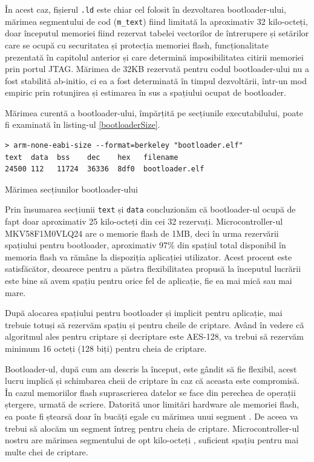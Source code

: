\documentclass[12pt,a4paper,titlepage]{report}
\begin{document}
În acest caz, fișierul \texttt{.ld} este chiar cel folosit în dezvoltarea bootloader-ului, mărimea segmentului de cod (\texttt{m\_text}) fiind limitată la aproximativ 32 kilo-octeți, doar începutul memoriei fiind rezervat tabelei vectorilor de întrerupere și setărilor care se ocupă cu securitatea și protecția memoriei flash, funcționalitate prezentată în capitolul anterior și care determină imposibilitatea citirii memoriei prin portul JTAG. Mărimea de 32KB rezervată pentru codul bootloader-ului nu a fost stabilită ab-initio, ci ea a fost determinată în timpul dezvoltării, într-un mod empiric prin rotunjirea și estimarea în sus a spațiului ocupat de bootloader.

Mărimea curentă a bootloader-ului, împărțită pe secțiunile executabilului, poate fi examinată în listing-ul \ref{bootloaderSize}.

\begin{listing}[h]
\begin{verbatim}
> arm-none-eabi-size --format=berkeley "bootloader.elf"
text  data  bss    dec    hex   filename
24500 112   11724  36336  8df0  bootloader.elf
\end{verbatim}

\caption{Mărimea secțiunilor bootloader-ului}
\label{bootloaderSize}
\end{listing}

Prin însumarea secțiunii \texttt{text} și \texttt{data} concluzionăm că bootloader-ul ocupă de fapt doar aproximativ 25 kilo-octeți din cei 32 rezervați. Microcontroller-ul MKV58F1M0VLQ24 are o memorie flash de 1MB, deci în urma rezervării spațiului pentru bootloader, aproximativ 97\% din spațiul total disponibil în memoria flash va rămâne la dispoziția aplicației utilizator. Acest procent este satisfăcător, deoarece pentru a păstra flexibilitatea propusă la începutul lucrării este bine să avem spațiu pentru orice fel de aplicație, fie ea mai mică sau mai mare.

După alocarea spațiului pentru bootloader și implicit pentru aplicație, mai trebuie totuși să rezervăm spațiu și pentru cheile de criptare. Având în vedere că algoritmul ales pentru criptare și decriptare este AES-128, va trebui să rezervăm minimum 16 octeți (128 biți) pentru cheia de criptare.

Bootloader-ul, după cum am descris la început, este gândit să fie flexibil, acest lucru implică și schimbarea cheii de criptare în caz că aceasta este compromisă. În cazul memoriilor flash suprascrierea datelor se face din perechea de operații ștergere, urmată de scriere. Datorită unor limitări hardware ale memoriei flash, ea poate fi ștearsă doar în bucăți egale cu mărimea unui segment \cite{kv5x}. De aceea va trebui să alocăm un segment întreg pentru cheia de criptare. Microcontroller-ul nostru are mărimea segmentului de opt kilo-octeți \cite{kv5x}, suficient spațiu pentru mai multe chei de criptare.
\end{document}
